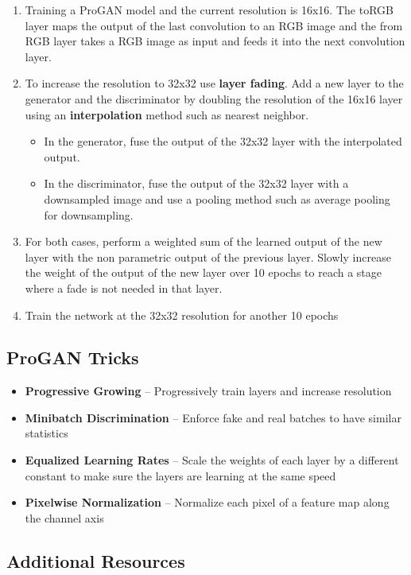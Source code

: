 \begin{enumerate}
    \item Training a ProGAN model and the current resolution is 16x16. The toRGB layer maps the output of the last convolution to an RGB image and the from RGB layer takes a RGB image as input and feeds it into the next convolution layer.
    \item To increase the resolution to 32x32 use \textbf{layer fading}. Add a new layer to the generator and the discriminator by doubling the resolution of the 16x16 layer using an \textbf{interpolation} method such as nearest neighbor.
    \begin{itemize}
        \item In the generator, fuse the output of the 32x32 layer with the interpolated output.
        \item In the discriminator, fuse the output of the 32x32 layer with a downsampled image and use a pooling method such as average pooling for downsampling.
    \end{itemize}
    \item For both cases, perform a weighted sum of the learned output of the new layer with the non parametric output of the previous layer. Slowly increase the weight of the output of the new layer over 10 epochs to reach a stage where a fade is not needed in that layer.
    \item Train the network at the 32x32 resolution for another 10 epochs
\end{enumerate}

\subsection{ProGAN Tricks}

\begin{itemize}
    \item \textbf{Progressive Growing} – Progressively train layers and increase resolution
    \item \textbf{Minibatch Discrimination} – Enforce fake and real batches to have similar statistics
    \item \textbf{Equalized Learning Rates} – Scale the weights of each layer by a different constant to make sure the layers are learning at the same speed
    \item \textbf{Pixelwise Normalization} – Normalize each pixel of a feature map along the channel axis
\end{itemize}

\subsection{Additional Resources}

